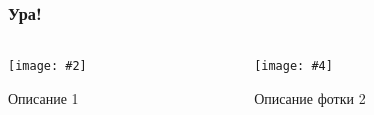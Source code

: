 \documentclass[10pt,pdf,hyperref={unicode}]{beamer}
\begin{document}

\newcommand{\twophoto}[5][\secname]{ %
   \begin{frame}
       \frametitle{#1}   %
       
       \begin{columns}[T]    %
           \centering
           
           \begin{column}{0.5\textwidth}
               \texttt{[image: \#2]}
               
                {#3}
                
            \end{column}
            \begin{column}{0.5\textwidth}
                \texttt{[image: \#4]}
                
                {#5}
                       
            \end{column}	
        \end{columns}	
    \end{frame} %
}    
    
\twophoto[Ура!]{ataka-slona-600x422.jpg}{Описание 1}{ataka-slona-600x422.jpg}{Описание фотки 2}

%    
%        
%                
%                 
\end{document}
